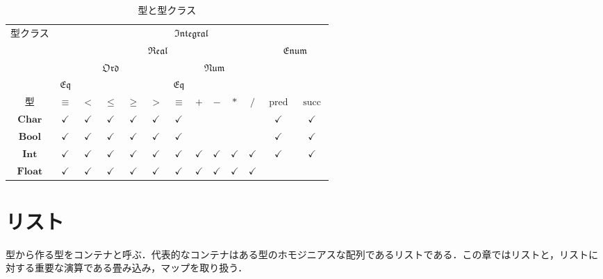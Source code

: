 \documentclass[a4paper,draft]{jsbook}
\newenvironment{leader}{\begingroup}{\endgroup}
\newcommand{\mType}[1]{\mathbf{#1}}
\newcommand{\mBoolType}{\mType{Bool}}
\newcommand{\mCharType}{\mType{Char}}
\newcommand{\mIntType}{\mType{Int}}
\newcommand{\mFloatType}{\mType{Float}}
\newcommand{\mSpecialTypeClass}[1]{\mathfrak{#1}} %
\newcommand{\mEqTypeClass}{\mSpecialTypeClass{Eq}}
\newcommand{\mOrdTypeClass}{\mSpecialTypeClass{Ord}}
\newcommand{\mNumTypeClass}{\mSpecialTypeClass{Num}}
\newcommand{\mRealTypeClass}{\mSpecialTypeClass{Real}}
\newcommand{\mEnumTypeClass}{\mSpecialTypeClass{Enum}}
\newcommand{\mIntegralTypeClass}{\mSpecialTypeClass{Integral}}
\DeclareMathOperator{\mathPred}{pred}
\DeclareMathOperator{\mathSucc}{succ}
\begin{document}
\begin{table*}
\caption{型と型クラス}
\label{tab:type-and-typeclass}
\begin{center}
\begin{tabular}{||c||c|c|c|c|c|c|c|c|c|c|c|c||}
\hline
\multirow{4}{*}{型クラス}
    &\multicolumn{12}{|c||}{$\mIntegralTypeClass$}\\
\cline{2-13}
\multirow{3}{*}{}
    &\multicolumn{10}{|c|}{$\mRealTypeClass$}
    &\multicolumn{2}{|c||}{$\mEnumTypeClass$}\\
\cline{2-11}
\multirow{2}{*}{}
    &\multicolumn{5}{|c|}{$\mOrdTypeClass$}
    &\multicolumn{5}{|c|}{$\mNumTypeClass$}
    &\multicolumn{2}{|c||}{ }\\
\cline{2-2}\cline{7-7}
{ }
    &$\mEqTypeClass$
    &\multicolumn{4}{|c|}{ }
    &$\mEqTypeClass$
    &\multicolumn{4}{|c|}{ }
    &\multicolumn{2}{|c||}{ }\\
\hline\hline
型
    &$\equiv$
    &$<$
    &$\le$
    &$\ge$
    &$>$
    &$\equiv$
    &$+$
    &$-$
    &$*$
    &$/$
    &$\mathPred$
    &$\mathSucc$\\
\hline
$\mCharType$
    &$\checkmark$
    &$\checkmark$
    &$\checkmark$
    &$\checkmark$
    &$\checkmark$
    &$\checkmark$
    &
    &
    &
    &
    &$\checkmark$
    &$\checkmark$\\
\hline
$\mBoolType$
    &$\checkmark$
    &$\checkmark$
    &$\checkmark$
    &$\checkmark$
    &$\checkmark$
    &$\checkmark$
    &
    &
    &
    &
    &$\checkmark$
    &$\checkmark$\\
\hline
$\mIntType$
    &$\checkmark$
    &$\checkmark$
    &$\checkmark$
    &$\checkmark$
    &$\checkmark$
    &$\checkmark$
    &$\checkmark$
    &$\checkmark$
    &$\checkmark$
    &$\checkmark$
    &$\checkmark$
    &$\checkmark$\\
\hline
$\mFloatType$
    &$\checkmark$
    &$\checkmark$
    &$\checkmark$
    &$\checkmark$
    &$\checkmark$
    &$\checkmark$
    &$\checkmark$
    &$\checkmark$
    &$\checkmark$
    &$\checkmark$
    &
    &\\
\hline
\end{tabular}
\end{center}
\end{table*}


\chapter{リスト}
\begin{leader}
型から作る型をコンテナと呼ぶ．代表的なコンテナはある型のホモジニアスな配列であるリストである．この章ではリストと，リストに対する重要な演算である畳み込み，マップを取り扱う．
\end{leader}
\end{document}
